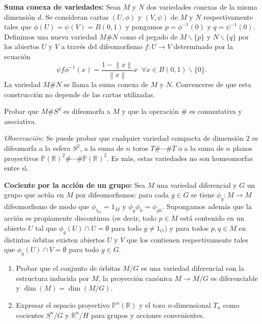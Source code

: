 \documentclass[11pt]{article}
\newcommand{\R}{{\mathbb{R}}}
\newcommand{\norm}[1]{\left\lVert#1\right\rVert}
\numberwithin{theorem}{subsection}
\begin{document}
\begin{question}
	\textbf{Suma conexa de variedades:} Sean $M$ y $N$ dos variedades conexas de la misma dimensi\'on $d$. Se consideran cartas $(U,\phi)$ y $(V,\psi)$ de $M$ y $N$ respectivamente tales que $\phi(U)=\psi(V)=B(0,1)$ y pongamos $p=\phi^{-1}(0)$ y $q=\psi^{-1}(0)$. Definimos una nueva variedad $M\# N$ como el pegado de $M\smallsetminus\{p\}$ y $N\smallsetminus\{q\}$ por los abiertos $U$ y $V$ a trav\'es del difeomorfismo $f:U\to V$ determinado por la ecuaci\'on $$\psi f\phi^{-1}(x)=\dfrac{1-\norm{x}}{\norm{x}} x \;\;\forall x\in B(0,1)\smallsetminus\{0\}.$$ La variedad $M\# N$ se llama la suma conexa de $M$ y $N$. Convencerse de que esta construcci\'on no depende de las cartas utilizadas.
	
	\noindent Probar que $M\# S^d$ es difeomorfa a $M$ y que la operaci\'on $\#$ es conmutativa y asociativa.
	\vspace{1em}
	
	\noindent \textit{Observaci\'on:} Se puede probar que cualquier variedad compacta de dimensi\'on $2$ es difeomorfa a la esfera $S^2$, a la suma de $n$ toros $T\#\cdots\# T$ o a la suma de $n$ planos proyectivos $\mathbb{P}(\R)^2\#\cdots\#\mathbb{P}(\R)^2$. Es m\'as, estas variedades no son homeomorfas entre s\'{\i}.
	
	
	
\end{question}

\begin{question}
	\textbf{Cociente por la acci\'on de un grupo:} Sea $M$ una variedad diferencial y $G$ un grupo que act\'ua en $M$ por difeomorfismos: para cada $g\in G$ se tiene $\phi_g:M\to M$ difeomorfismo de modo que $\phi_{1_G}=1_M$ y $\phi_g\phi_h=\phi_{gh}$. Supongamos adem\'as que la acci\'on es propiamente discontinua (es decir, todo $p\in M$ est\'a contenido en un abierto $U$ tal que $\phi_g(U)\cap U=\emptyset$ para todo $g\neq 1_G$) y para todos $p,q\in M$ en distintas \'orbitas existen abiertos $U$ y $V$ que los contienen respectivamente tales que $\phi_g(U)\cap V = \emptyset$ para todo $g\in G$.
	\begin{enumerate}
		\item Probar que el conjunto de \'orbitas $M/G$ es una variedad diferencial con la estructura inducida por $M$, la proyecci\'on can\'onica $M\to M/G$ es diferenciable y $\dim(M)=\dim(M/G)$.
		\item Expresar el espacio proyectivo $\mathbb{P}^n(\R)$ y el toro $n$-dimensional $T_n$ como cocientes $S^n/G$ y $\R^n/H$ para grupos y acciones convenientes.
	\end{enumerate}
\end{question}
\end{document}
